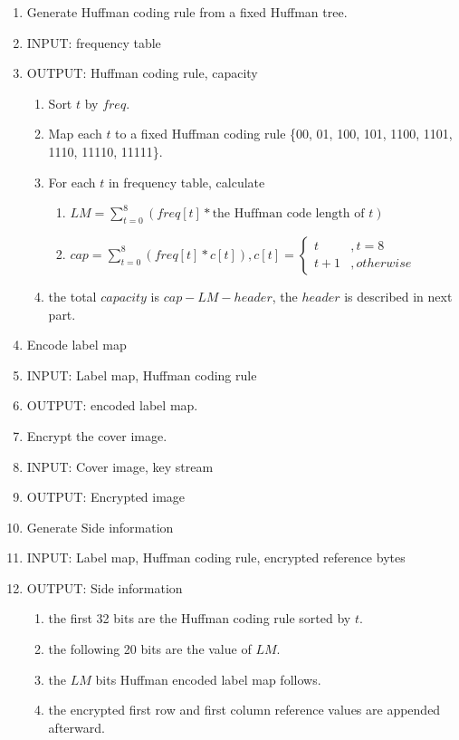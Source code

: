 \documentclass{article}
\begin{document}
\begin{enumerate}
	\item Generate Huffman coding rule from a fixed Huffman tree.
	\item[] INPUT: frequency table
	\item[] OUTPUT: Huffman coding rule, capacity
	      \begin{enumerate}
		      \item Sort $t$ by $freq$.
		      \item Map each $t$ to a fixed Huffman coding rule \{00, 01, 100, 101, 1100, 1101, 1110, 11110, 11111\}.
		      \item For each $t$ in frequency table, calculate
		            \begin{enumerate}
			            \item $LM = \sum_{t=0}^{8} (freq[t] * \textrm{the Huffman code length of }t) $
			            \item $cap = \sum_{t=0}^{8} (freq[t] * c[t]), c[t] = \left\{
				                  \begin{array}{rl}
					                  t     & , t = 8     \\
					                  t + 1 & , otherwise
				                  \end{array} \right. $
		            \end{enumerate}
		      \item the total $capacity$ is $cap - LM - header$, the $header$ is described in next part.
	      \end{enumerate}
	      
	\item Encode label map
	\item[] INPUT: Label map, Huffman coding rule
	\item[] OUTPUT: encoded label map.
	      
	\item Encrypt the cover image.
	\item[] INPUT: Cover image, key stream
	\item[] OUTPUT: Encrypted image
	      
	\item Generate Side information
	\item[] INPUT: Label map, Huffman coding rule, encrypted reference bytes
	\item[] OUTPUT: Side information
	      \begin{enumerate}
		      \item the first 32 bits are the Huffman coding rule sorted by $t$.
		      \item the following 20 bits are the value of $LM$.
		      \item the $LM$ bits Huffman encoded label map follows.
		      \item the encrypted first row and first column reference values are appended afterward.
	      \end{enumerate}
	      

\end{enumerate}
\end{document}

